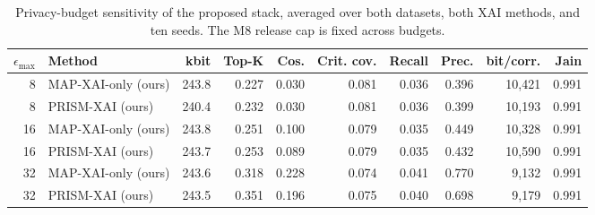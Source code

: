 \begin{table}[htbp]\centering\small
\caption{Privacy-budget sensitivity of the proposed stack, averaged over both datasets, both XAI methods, and ten seeds. The M8 release cap is fixed across budgets.}
\label{tab:epsilon-scorecard}
\begin{tabular}{r l r r r r r r r r}
\toprule
$\epsilon_{\max}$ & Method & kbit & Top-K & Cos. & Crit. cov. & Recall & Prec. & bit/corr. & Jain \\
\midrule
8 & MAP-XAI-only (ours) & 243.8 & 0.227 & 0.030 & 0.081 & 0.036 & 0.396 & 10,421 & 0.991 \\
8 & PRISM-XAI (ours) & 240.4 & 0.232 & 0.030 & 0.081 & 0.036 & 0.399 & 10,193 & 0.991 \\
16 & MAP-XAI-only (ours) & 243.8 & 0.251 & 0.100 & 0.079 & 0.035 & 0.449 & 10,328 & 0.991 \\
16 & PRISM-XAI (ours) & 243.7 & 0.253 & 0.089 & 0.079 & 0.035 & 0.432 & 10,590 & 0.991 \\
32 & MAP-XAI-only (ours) & 243.6 & 0.318 & 0.228 & 0.074 & 0.041 & 0.770 & 9,132 & 0.991 \\
32 & PRISM-XAI (ours) & 243.5 & 0.351 & 0.196 & 0.075 & 0.040 & 0.698 & 9,179 & 0.991 \\
\bottomrule
\end{tabular}
\end{table}
